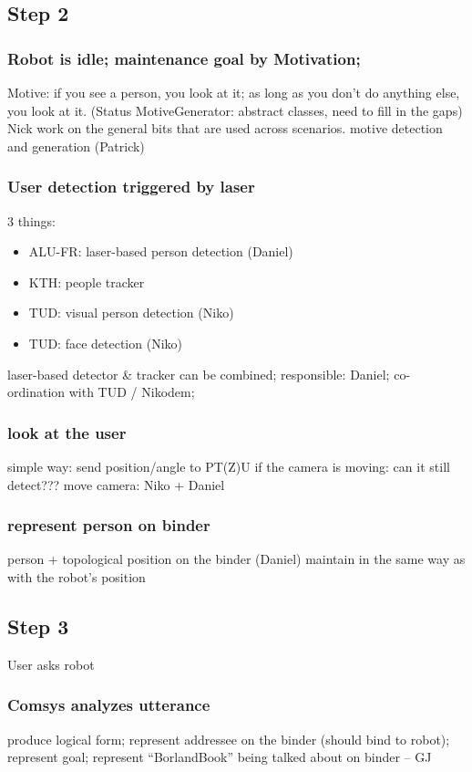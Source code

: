 \documentclass{article}
\begin{document}
\subsection{Step 2}
\subsubsection{Robot is idle; maintenance goal by Motivation;}
Motive: if you see a person, you look at it; as long as you don't do anything else,
you look at it. (Status MotiveGenerator: abstract classes, need to fill in the gaps)
Nick work on the general bits that are used across scenarios.
motive detection and generation (Patrick)

\subsubsection{User detection triggered by laser}
3 things: 
\begin{itemize} 
	\item ALU-FR: laser-based person detection (Daniel)
	\item KTH: people tracker
	\item TUD: visual person detection (Niko)
	\item TUD: face detection (Niko)
\end{itemize}
laser-based detector \& tracker can be combined; responsible: Daniel;
co-ordination with TUD / Nikodem;

\subsubsection{look at the user}
simple way: send position/angle to PT(Z)U
if the camera is moving: can it still detect???
move camera: Niko + Daniel

\subsubsection{represent person on binder}
person + topological position on the binder (Daniel)
maintain in the same way as with the robot's position

\subsection{Step 3}
User asks robot

\subsubsection{Comsys analyzes utterance}
produce logical form; represent addressee on the binder (should bind to robot);
represent goal; represent ``BorlandBook'' being talked about on binder
-- GJ
\end{document}
